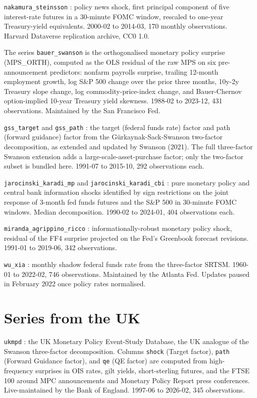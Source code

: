 \texttt{nakamura\_steinsson} \citep{nakamura2018high}: policy news shock, first principal component of five interest-rate futures in a 30-minute FOMC window, rescaled to one-year Treasury-yield equivalents. 2000-02 to 2014-03, 170 monthly observations. Harvard Dataverse replication archive, CC0 1.0.

The series \texttt{bauer\_swanson} \citep{bauer2023reassessment} is the orthogonalised monetary policy surprise (MPS\_ORTH), computed as the OLS residual of the raw MPS on six pre-announcement predictors: nonfarm payrolls surprise, trailing 12-month employment growth, log S\&P 500 change over the prior three months, 10y-2y Treasury slope change, log commodity-price-index change, and Bauer-Chernov option-implied 10-year Treasury yield skewness. 1988-02 to 2023-12, 431 observations. Maintained by the San Francisco Fed.

\texttt{gss\_target} and \texttt{gss\_path} \citep{gurkaynak2005actions, swanson2021measuring}: the target (federal funds rate) factor and path (forward guidance) factor from the Gürkaynak-Sack-Swanson two-factor decomposition, as extended and updated by Swanson (2021). The full three-factor Swanson extension adds a large-scale-asset-purchase factor; only the two-factor subset is bundled here. 1991-07 to 2015-10, 292 observations each.

\texttt{jarocinski\_karadi\_mp} and \texttt{jarocinski\_karadi\_cbi} \citep{jarocinski2020deconstructing}: pure monetary policy and central bank information shocks identified by sign restrictions on the joint response of 3-month fed funds futures and the S\&P 500 in 30-minute FOMC windows. Median decomposition. 1990-02 to 2024-01, 404 observations each.

\texttt{miranda\_agrippino\_ricco} \citep{miranda2021transmission}: informationally-robust monetary policy shock, residual of the FF4 surprise projected on the Fed's Greenbook forecast revisions. 1991-01 to 2019-06, 342 observations.

\texttt{wu\_xia} \citep{wu2016measuring}: monthly shadow federal funds rate from the three-factor SRTSM. 1960-01 to 2022-02, 746 observations. Maintained by the Atlanta Fed. Updates paused in February 2022 once policy rates normalised.

\section{Series from the UK}\label{series-from-the-uk}

\texttt{ukmpd} \citep{braun2025measuring}: the UK Monetary Policy Event-Study Database, the UK analogue of the Swanson three-factor decomposition. Columns \texttt{shock} (Target factor), \texttt{path} (Forward Guidance factor), and \texttt{qe} (QE factor) are computed from high-frequency surprises in OIS rates, gilt yields, short-sterling futures, and the FTSE 100 around MPC announcements and Monetary Policy Report press conferences. Live-maintained by the Bank of England. 1997-06 to 2026-02, 345 observations.

